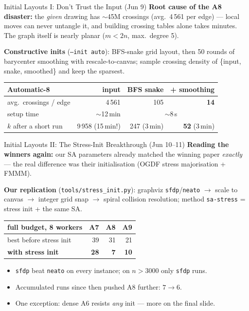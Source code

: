 \begin{frame}{Initial Layouts I: Don't Trust the Input (Jun 9)}
  \textbf{Root cause of the A8 disaster:} the \emph{given} drawing has $\sim$45M crossings
  (avg.\ 4\,561 per edge) --- local moves can never untangle it, and building crossing
  tables alone takes minutes. The graph itself is nearly planar ($m<2n$, max.\ degree 5).
  \medskip

  \textbf{Constructive inits} (\texttt{--init auto}): BFS-snake grid layout, then 50 rounds
  of barycenter smoothing with rescale-to-canvas; sample crossing density of
  \{input, snake, smoothed\} and keep the sparsest.
  \begin{center}
    \begin{tabular}{lrrr}
      \toprule
      Automatic-8 & \textbf{input} & \textbf{BFS snake} & \textbf{+ smoothing} \\
      \midrule
      avg.\ crossings / edge & 4\,561 & 105 & \textbf{14} \\
      setup time             & $\sim$12\,min & \multicolumn{2}{c}{$\sim$8\,s} \\
      $k$ after a short run  & 9\,958 (15\,min!) & 247 (3\,min) & \textbf{52} (3\,min) \\
      \bottomrule
    \end{tabular}
  \end{center}
\end{frame}

\begin{frame}{Initial Layouts II: The Stress-Init Breakthrough (Jun 10--11)}
  \textbf{Reading the winners again:} our SA parameters already matched the winning paper
  \emph{exactly} --- the real difference was their initialisation
  (OGDF stress majorisation + FMMM).
  \medskip

  \textbf{Our replication} (\texttt{tools/stress\_init.py}): graphviz \texttt{sfdp}/\texttt{neato}
  $\to$ scale to canvas $\to$ integer grid snap $\to$ spiral collision resolution;
  method \texttt{sa-stress} = stress init + the same SA.
  \begin{center}
    \begin{tabular}{lrrr}
      \toprule
      full budget, 8 workers & A7 & A8 & A9 \\
      \midrule
      best before stress init        & 39 & 31 & 21 \\
      \textbf{with stress init}      & \textbf{28} & \textbf{7} & \textbf{10} \\
      \bottomrule
    \end{tabular}
  \end{center}
  \medskip
  \begin{itemize}
    \item \texttt{sfdp} beat \texttt{neato} on every instance; on $n>3000$ only \texttt{sfdp} runs.
    \item Accumulated runs since then pushed A8 further: $7 \to 6$.
    \item One exception: dense A6 resists \emph{any} init --- more on the final slide.
  \end{itemize}
\end{frame}

